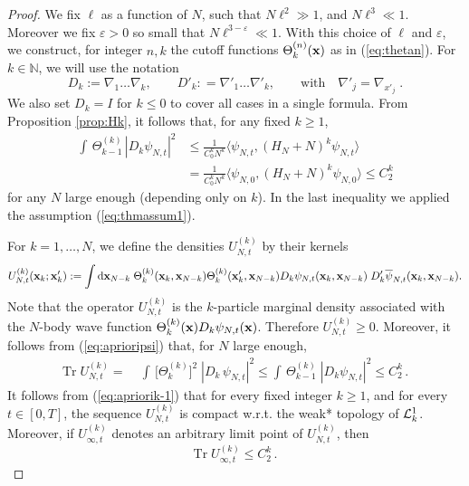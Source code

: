 \documentclass[11pt]{article}
\newcommand{\rd}{{\rm d}}
\newcommand{\eps}{\varepsilon}
\newcommand{\bx}{{\bf x}}
\newcommand{\e}{\varepsilon}
\newcommand{\bN}{{\mathbb N}}
\newcommand{\tr}{\mbox{Tr}}
\newcommand{\cL}{{\cal L}}
\begin{document}
\begin{proof}
We fix $\ell$ as a function of $N$, such that $N\ell^2 \gg 1$, and
$N\ell^3 \ll 1$. Moreover we fix $\e
>0$ so small that $N \ell^{3-\e} \ll 1$. With this choice of $\ell$
and $\eps$, we construct, for integer $n,k$ the cutoff functions
$\Theta^{(n)}_k (\bx)$ as in (\ref{eq:thetan}). For $k\in \bN$, we
will use the notation
\[ D_k := \nabla_1 \dots \nabla_k, \qquad D'_k:
= \nabla'_1 \dots \nabla'_k, \qquad \mbox{with} \quad \nabla'_j = \nabla_{x'_j}\; .
\]
We also set $D_k=I$ for $k\leq 0$ to cover all cases in a single
formula. {F}rom Proposition \ref{prop:Hk}, it follows that, for any
fixed $k \geq 1$,
\begin{equation}\label{eq:aprioripsi}
\begin{split}
\int  \, \Theta^{(k)}_{k-1} \, |D_k  \psi_{N,t}|^2
 &\leq \frac{1}{C_0^k N^k} \langle  \psi_{N,t} , (H_N + N)^k
 \psi_{N,t} \rangle \\ &= \frac{1}{C_0^k N^k} \langle
\psi_{N,0} , (H_N + N)^k  \psi_{N,0} \rangle \leq C_2^k
\end{split}
\end{equation}
for any $N$ large enough (depending only on $k$). In the last
inequality we applied the assumption (\ref{eq:thmassum1}).

\medskip

For $k=1, \dots,N$, we define the densities $U^{(k)}_{N,t}$ by their
kernels
\begin{equation}\label{eq:apriorik-0}
\begin{split}
U^{(k)}_{N,t} (\bx_k; \bx'_k) := \int \rd \bx_{N-k} \;
\Theta_k^{(k)} (\bx_k, \bx_{N-k}) \Theta_k^{(k)} (\bx'_k, \bx_{N-k})
D_k \psi_{N,t} (\bx_k,\bx_{N-k}) \; D'_k \overline{ \psi}_{N,t}
(\bx_k,\bx_{N-k}).
\end{split}
\end{equation}
Note that the operator $U^{(k)}_{N,t}$ is the $k$-particle marginal
density associated with the $N$-body wave function $\Theta_k^{(k)}
(\bx) D_k  \psi_{N,t} (\bx)$. Therefore $U^{(k)}_{N,t} \geq 0$.
Moreover, it follows from (\ref{eq:aprioripsi}) that, for $N$ large
enough,
\begin{equation}\label{eq:apriorik-1}
\begin{split}
\tr \; U^{(k)}_{N,t} = \;& \int  \, \big[ \Theta^{(k)}_k \big]^2
 \;
|D_k \,  \psi_{N,t}|^2 \leq  \int  \,
\Theta^{(k)}_{k-1} \; |D_k  \psi_{N,t} |^2  \leq C_2^k\,.
\end{split}
\end{equation}
It follows from (\ref{eq:apriorik-1}) that for every fixed integer
$k \geq 1$, and for every $t \in [0,T]$, the sequence
$U^{(k)}_{N,t}$ is compact w.r.t. the weak* topology of $\cL^1_k$.
Moreover, if $U^{(k)}_{\infty,t}$ denotes an arbitrary limit point
of $U^{(k)}_{N,t}$, then
\begin{equation}\label{eq:apriorik-1b}
 \tr \; U^{(k)}_{\infty,t} \leq C_2^k \,.
 \end{equation}


\end{proof}
\end{document}
